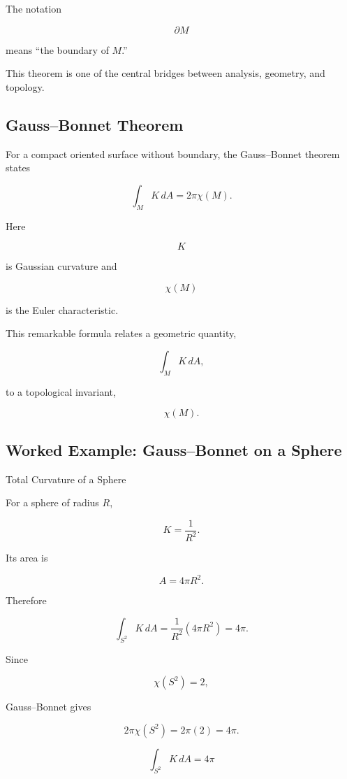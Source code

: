 The notation

\[
\partial M
\]

means ``the boundary of \(M\).''

This theorem is one of the central bridges between analysis, geometry, and
topology.

\subsection{Gauss--Bonnet Theorem}
\label{subsec:gauss-bonnet}

For a compact oriented surface without boundary, the Gauss--Bonnet theorem
states

\[
\boxed{
\int_M K\,dA
=
2\pi\chi(M).
}
\]

Here

\[
K
\]

is Gaussian curvature and

\[
\chi(M)
\]

is the Euler characteristic.

This remarkable formula relates a geometric quantity,

\[
\int_MK\,dA,
\]

to a topological invariant,

\[
\chi(M).
\]

\subsection{Worked Example: Gauss--Bonnet on a Sphere}
\label{subsec:worked-gauss-bonnet-sphere}

\begin{workedexamplebox}{Total Curvature of a Sphere}

For a sphere of radius \(R\),

\[
K=\frac{1}{R^2}.
\]

Its area is

\[
A=4\pi R^2.
\]

Therefore

\[
\int_{S^2}K\,dA
=
\frac{1}{R^2}
(4\pi R^2)
=
4\pi.
\]

Since

\[
\chi(S^2)=2,
\]

Gauss--Bonnet gives

\[
2\pi\chi(S^2)
=
2\pi(2)
=
4\pi.
\]

\begin{answerbox}
\[
\boxed{
\int_{S^2}K\,dA=4\pi
}
\]
\end{answerbox}
\end{workedexamplebox}

